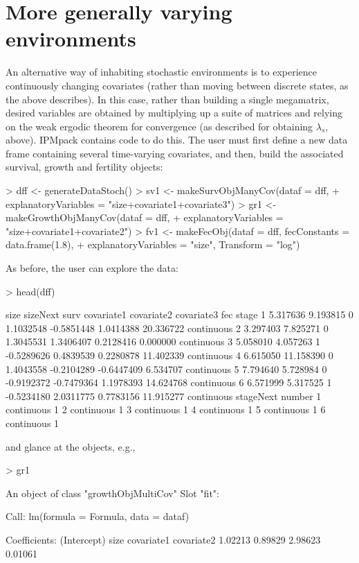 \documentclass{article}
\begin{document}
\section{More generally varying environments}

An alternative way of inhabiting stochastic environments is to experience continuously changing covariates (rather than moving between discrete states, as the above describes). In this case, rather than building a single megamatrix, desired variables are obtained by multiplying up a suite of matrices and relying on the weak
ergodic theorem for convergence (as described for obtaining $\lambda_s$, above). IPMpack contains code to do this. The user must first define a new data frame containing several time-varying covariates, and then, build the associated survival, growth and fertility objects: 
\begin{Schunk}
\begin{Sinput}
> dff <- generateDataStoch()
> sv1 <- makeSurvObjManyCov(dataf = dff, 
+                           explanatoryVariables = "size+covariate1+covariate3")
> gr1 <- makeGrowthObjManyCov(dataf = dff, 
+                             explanatoryVariables = "size+covariate1+covariate2")
> fv1 <- makeFecObj(dataf = dff, fecConstants = data.frame(1.8), 
+                   explanatoryVariables = "size", Transform = "log")
\end{Sinput}
\end{Schunk}
As before, the user can explore the data: 
\begin{Schunk}
\begin{Sinput}
> head(dff)
\end{Sinput}
\begin{Soutput}
      size  sizeNext surv covariate1 covariate2 covariate3       fec      stage
1 5.317636  9.193815    0  1.1032548 -0.5851448  1.0414388 20.336722 continuous
2 3.297403  7.825271    0  1.3045531  1.3406407  0.2128416  0.000000 continuous
3 5.058010  4.057263    1 -0.5289626  0.4839539  0.2280878 11.402339 continuous
4 6.615050 11.158390    0  1.4043558 -0.2104289 -0.6447409  6.534707 continuous
5 7.794640  5.728984    0 -0.9192372 -0.7479364  1.1978393 14.624768 continuous
6 6.571999  5.317525    1 -0.5234180  2.0311775  0.7783156 11.915277 continuous
   stageNext number
1 continuous      1
2 continuous      1
3 continuous      1
4 continuous      1
5 continuous      1
6 continuous      1
\end{Soutput}
\end{Schunk}
and glance at the objects, e.g., 
\begin{Schunk}
\begin{Sinput}
> gr1
\end{Sinput}
\begin{Soutput}
An object of class "growthObjMultiCov"
Slot "fit":

Call:
lm(formula = Formula, data = dataf)

Coefficients:
(Intercept)         size   covariate1   covariate2  
    1.02213      0.89829      2.98623      0.01061  
\end{Soutput}
\end{Schunk}
\end{document}
